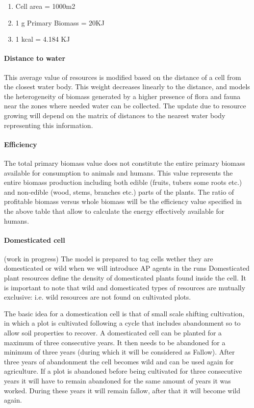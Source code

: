 \documentclass[11pt,oneside,a4paper,openright]{report}
\begin{document}
\begin{enumerate}
 \item Cell area = 1000m2
 \item 1 g Primary Biomass = 20KJ
 \item 1 kcal = 4.184 KJ
\end{enumerate}



\paragraph{Distance to water}
This average value of resources is modified based on the distance of a cell from the closest
water body. This weight decreases linearly to the distance, and models the heterogeneity of
biomass generated by a higher presence of flora and fauna near the zones where needed
water can be collected. The update due to resource growing will depend on the matrix of distances
to the nearest water body representing this information.

\paragraph{Efficiency}
The total primary biomass value does not constitute the entire primary biomass available for
consumption to animals and humans. This value represents the entire biomass production
including both edible (fruits, tubers some roots etc.) and non-edible (wood, stems, branches
etc.) parts of the plants. The ratio of profitable biomass versus whole biomass will be the
efficiency value specified in the above table that allow to calculate the energy effectively
available for humans.

\paragraph{Domesticated cell} (work in progress)
The model is prepared to tag cells wether they are domesticated or wild when we will introduce AP 
agents in the runs
Domesticated plant resources define the density of domesticated plants found inside the cell. It is important to note that wild and domesticated types of resources 
are mutually exclusive: i.e. wild resources are not found on cultivated plots. 

The basic idea for a domestication cell is that of small scale shifting cultivation, in which a plot is
cultivated following a cycle that includes abandonment so to allow soil properties to recover. A
domesticated cell can be planted for a maximum of three consecutive years. It then needs to be
abandoned for a minimum of three years (during which it will be considered as Fallow). After three
years of abandonment the cell becomes wild and can be used again for agriculture. If a plot is
abandoned before being cultivated for three consecutive years it will have to remain abandoned for
the same amount of years it was worked. During these years it will remain fallow, after that it will
become wild again.
\end{document}
